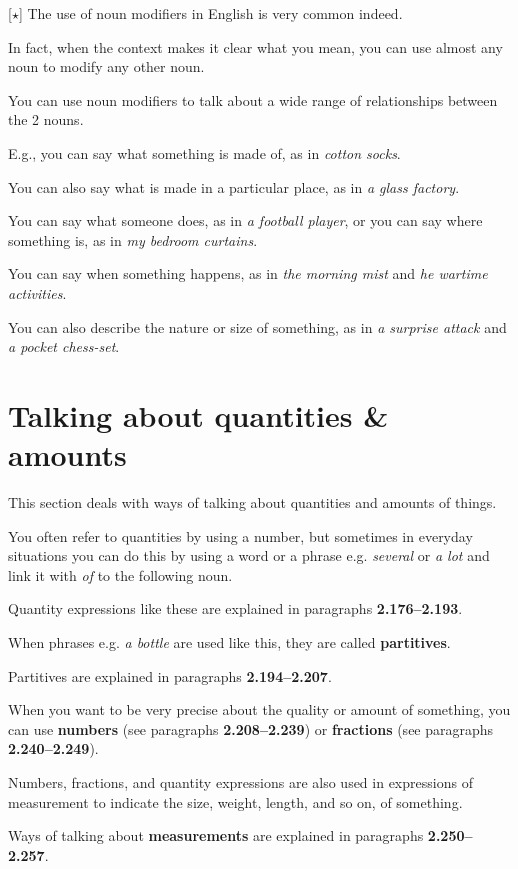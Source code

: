 \documentclass[oneside]{book}
\numberwithin{equation}{section}
\begin{document}
%
\noindent{} [$\star$] The use of noun modifiers in English is very common indeed.

In fact, when the context makes it clear what you mean, you can use almost any noun to modify any other noun.

You can use noun modifiers to talk about a wide range of relationships between the 2 nouns.

%
E.g., you can say what something is made of, as in \textit{cotton socks}.

You can also say what is made in a particular place, as in \textit{a glass factory}.

You can say what someone does, as in \textit{a football player}, or you can say where something is, as in \textit{my bedroom curtains}.

%
You can say when something happens, as in \textit{the morning mist} and \textit{he wartime activities}.

You can also describe the nature or size of something, as in \textit{a surprise attack} and \textit{a pocket chess-set}.

\section{Talking about quantities \& amounts}
\noindent{} This section deals with ways of talking about quantities and amounts of things.

You often refer to quantities by using a number, but sometimes in everyday situations you can do this by using a word or a phrase e.g. \textit{several} or \textit{a lot} and link it with \textit{of} to the following noun.

Quantity expressions like these are explained in paragraphs \textbf{2.176--2.193}.

When phrases e.g. \textit{a bottle} are used like this, they are called \textbf{partitives}.

Partitives are explained in paragraphs \textbf{2.194--2.207}.

%
When you want to be very precise about the quality or amount of something, you can use \textbf{numbers} (see paragraphs \textbf{2.208--2.239}) or \textbf{fractions} (see paragraphs \textbf{2.240--2.249}).

%
Numbers, fractions, and quantity expressions are also used in expressions of measurement to indicate the size, weight, length, and so on, of something.

Ways of talking about \textbf{measurements} are explained in paragraphs \textbf{2.250--2.257}.
\end{document}
